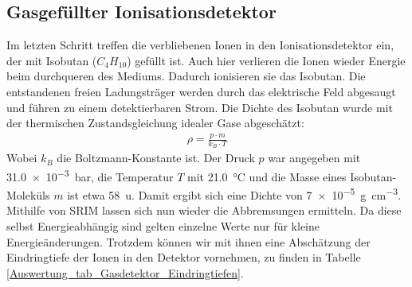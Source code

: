 \subsection{Gasgefüllter Ionisationsdetektor}
Im letzten Schritt treffen die verbliebenen Ionen in den Ionisationsdetektor ein, der mit Isobutan ($C_{4}H_{10}$) gefüllt ist.
Auch hier verlieren die Ionen wieder Energie beim durchqueren des Mediums.
Dadurch ionisieren sie das Isobutan.
Die entstandenen freien Ladungsträger werden durch das elektrische Feld abgesaugt und führen zu einem detektierbaren Strom.
Die Dichte des Isobutan wurde mit der thermischen Zustandsgleichung idealer Gase abgeschätzt:
\begin{gather}
    \rho = \frac{p \cdot m}{k_{B} \cdot T}
\end{gather}
Wobei $k_{B}$ die Boltzmann-Konstante ist.
Der Druck $p$ war angegeben mit \SI{31.0e-3}{\bar}, die Temperatur $T$ mit \SI{21.0}{\degreeCelsius} und die Masse eines Isobutan-Moleküls $m$ ist etwa \SI{58}{\atomicmassunit}.
Damit ergibt sich eine Dichte von \SI{7e-5}{\gram\per\cubic\centi\metre}.
Mithilfe von SRIM lassen sich nun wieder die Abbremsungen ermitteln.
Da diese selbst Energieabhängig sind gelten einzelne Werte nur für kleine Energieänderungen.
Trotzdem können wir mit ihnen eine Abschätzung der Eindringtiefe der Ionen in den Detektor vornehmen, zu finden in Tabelle \ref{Auswertung_tab_Gasdetektor_Eindringtiefen}.

